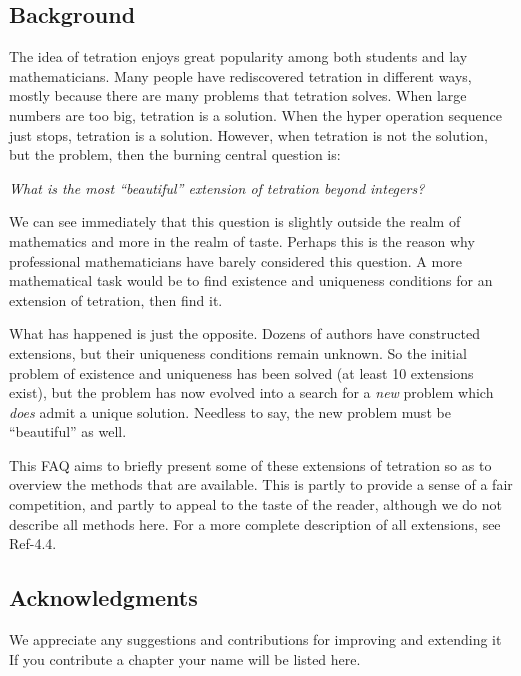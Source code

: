 \documentclass[12pt]{article}
\theoremstyle{definition}
\begin{document}
\subsection{Background}
The idea of tetration enjoys great popularity among both students and lay
mathematicians. Many people have rediscovered tetration in different ways, mostly because there are many problems that tetration solves. 
When large numbers are too big, tetration is a solution. 
When the hyper operation sequence just stops, tetration is a solution. 
However, when tetration is not the solution, but the problem, then the burning central question is:

\begin{center}
\it What is the most ``beautiful'' extension of tetration beyond integers?
\end{center}

We can see immediately that this question is slightly outside the realm of
mathematics and more in the realm of taste. Perhaps this is the
reason why professional mathematicians have barely considered this
question. A more mathematical task would be to find existence and uniqueness
conditions for an extension of tetration, then find it.

What has happened is just the opposite. Dozens of authors have constructed extensions, but their uniqueness conditions remain unknown. So the initial problem of existence and uniqueness has been solved (at least 10 extensions exist), but the problem has now evolved into a search for a {\it new} problem which {\it does} admit a unique solution. Needless to say, the new problem must be ``beautiful'' as well.

This FAQ aims to briefly present some of these extensions of tetration so as to overview the methods that are available. This is partly to provide a sense of a fair competition, and partly to appeal to the taste of the reader, although we do not describe all methods here.
For a more complete description of all extensions, see Ref-4.4.

\subsection{Acknowledgments}
We appreciate any suggestions and contributions for improving and extending it 
If you contribute a chapter your name will be listed here.
\end{document}
